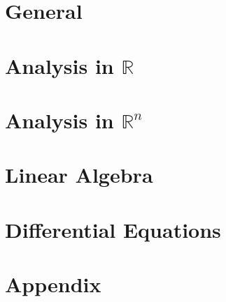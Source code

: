%
%





\maketitle
\tableofcontents
\part{General}




\part{Analysis in $\mathbb{R}$}
 







\part{Analysis in $\mathbb{R}^n$}



\part{Linear Algebra}

\part{Differential Equations}







\part{Appendix}


\printindex

